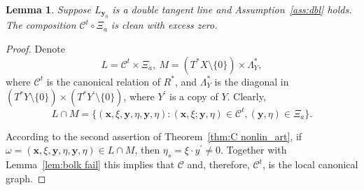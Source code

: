 \documentclass[11pt]{article}
\newcommand{\be}{\begin{equation}}
\newcommand{\ee}{\end{equation}}
\newcommand{\bs}{\begin{split}}
\newcommand{\cC}{\mathcal C}
\newcommand{\br}{\mathbb{R}}
\def\red#1{\textcolor[rgb]{1, 0, 0}{#1} }
\numberwithin{equation}{section}
\newcommand{\vy}{\mathbf{y}}
\newcommand{\vx}{\mathbf{x}}
\newcommand{\Cc}{\mathcal{C}}
\newtheorem{lemma}[theorem]{Lemma}
\theoremstyle{definition}
\begin{document}
\begin{lemma}\label{lem_clean}
Suppose $L_{\vy_0}$ is a double tangent line and Assumption~\ref{ass:dbl} holds. 
The composition $\Cc^t \circ \Xi_a$ is clean with excess zero.
\end{lemma}

\begin{proof}
Denote
\be
L=\cC^t\times\Xi_a,\ M=(T^*X\setminus \{0\})\times \Lambda_Y^*,
\ee
where $\cC^t$ is the canonical relation of $R^*$, and $\Lambda_Y^*$ is the diagonal in $(T^*Y\setminus \{0\})\times (T^*Y^\prime\setminus \{0\})$, where $Y^\prime$ is a copy of $Y$. Clearly,
\be\label{LcapM}
L\cap M=\big\{(\vx,\xi,\vy,\eta,\vy,\eta) : (\vx,\xi;\vy,\eta) \in \mathcal{C}^t, (\vy,\eta) \in \Xi_a\big\}.
\ee

According to the second assertion of Theorem~\ref{thm:C nonlin_art}, if $\omega=(\vx,\xi,\vy,\eta,\vy,\eta)\in L\cap M$, then $\eta_s=\xi\cdot y^\prime\not=0$. Together with Lemma~\ref{lem:bolk fail} this implies that $\cC$ and, therefore, $\cC^t$, is the local canonical graph.



\end{proof}
\end{document}
